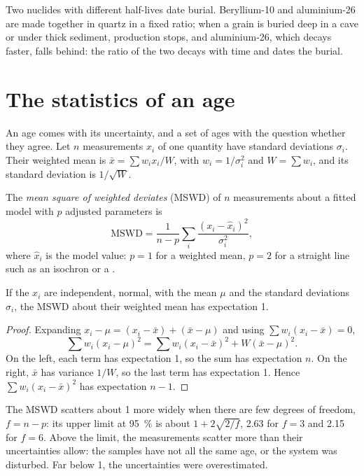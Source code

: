 Two nuclides with different half-lives date burial. Beryllium-10 and
aluminium-26 are made together in quartz in a fixed ratio; when a grain is
buried deep in a cave or under thick sediment, production stops, and
aluminium-26, which decays faster, falls behind: the ratio of the two decays
with time and dates the burial.

\section{The statistics of an age}\label{sec:b3:advanced-geochronology:statistics}

An age comes with its uncertainty, and a set of ages with the question
whether they agree. Let $n$ measurements $x_i$ of one quantity have standard
deviations $\sigma_i$. Their weighted mean is $\bar x = \sum w_ix_i/W$, with
$w_i = 1/\sigma_i^2$ and $W = \sum w_i$, and its standard deviation is
$1/\sqrt W$.

\begin{definition}\label{def:b3:advanced-geochronology:mswd}
The \emph{mean square of weighted deviates}
(MSWD) of $n$ measurements about a fitted model with $p$ adjusted parameters
is
\[
\mathrm{MSWD} = \frac{1}{n - p}\sum_i \frac{(x_i - \hat x_i)^2}{\sigma_i^2},
\]
where $\hat x_i$ is the model value: $p = 1$ for a weighted mean, $p = 2$ for
a straight line such as an isochron or a .
\end{definition}

\begin{proposition}\label{prop:b3:advanced-geochronology:mswd}
If the $x_i$ are independent, normal, with the mean $\mu$ and the standard
deviations $\sigma_i$, the MSWD about their weighted mean has expectation 1.
\end{proposition}

\begin{proof}
Expanding $x_i - \mu = (x_i - \bar x) + (\bar x - \mu)$ and using $\sum
w_i(x_i - \bar x) = 0$,
\[
\sum w_i(x_i - \mu)^2 = \sum w_i(x_i - \bar x)^2 + W(\bar x - \mu)^2.
\]
On the left, each term has expectation 1, so the sum has expectation $n$. On
the right, $\bar x$ has variance $1/W$, so the last term has expectation 1.
Hence $\sum w_i(x_i - \bar x)^2$ has expectation $n - 1$.
\end{proof}

The MSWD scatters about 1 more widely when there are few degrees of freedom,
$f = n - p$: its upper limit at \qty{95}{\percent} is about $1 +
2\sqrt{2/f}$, 2.63 for $f = 3$ and 2.15 for $f = 6$. Above the limit, the
measurements scatter more than their uncertainties allow: the samples have
not all the same age, or the system was disturbed. Far below 1, the
uncertainties were overestimated.

